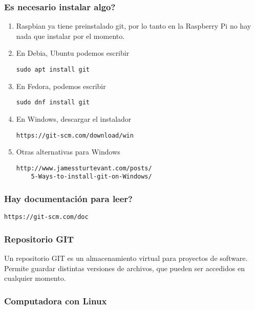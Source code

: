 \documentclass{beamer}
\begin{document}
\begin{frame}[fragile]
\frametitle{\textquestiondown Es necesario instalar algo?}

\begin{enumerate}
\item Raspbian ya tiene preinstalado git, por lo tanto en la Raspberry Pi no hay nada que instalar por el momento.

\item En Debia, Ubuntu podemos escribir
\begin{verbatim}
sudo apt install git
\end{verbatim}

\item En Fedora, podemos escribir
\begin{verbatim}
sudo dnf install git
\end{verbatim}

\item En Windows, descargar el instalador
\begin{verbatim}
https://git-scm.com/download/win
\end{verbatim}

\item Otras alternativas para Windows
\begin{verbatim}
http://www.jamessturtevant.com/posts/
    5-Ways-to-install-git-on-Windows/
\end{verbatim}

\end{enumerate}

\end{frame}

\begin{frame}[fragile]
\frametitle{\textquestiondown Hay documentaci\'{o}n para leer?}

\begin{verbatim}
https://git-scm.com/doc
\end{verbatim}

\end{frame}

\begin{frame}
\frametitle{Repositorio GIT}

Un repositorio GIT es un almacenamiento virtual para proyectos de software. 
Permite guardar distintas versiones de archivos, que pueden ser accedidos en cualquier momento.

\end{frame}

\subsubsection{Computadora con Linux}
\end{document}
